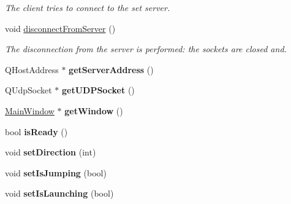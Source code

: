 \begin{DoxyCompactItemize}
\begin{DoxyCompactList}\small\item\em The client tries to connect to the set server. \item\end{DoxyCompactList}\item 
\hypertarget{classClient_a43ffca98bbbceba21e56b5af97586498}{
void \hyperlink{classClient_a43ffca98bbbceba21e56b5af97586498}{disconnectFromServer} ()}
\label{classClient_a43ffca98bbbceba21e56b5af97586498}

\begin{DoxyCompactList}\small\item\em The disconnection from the server is performed: the sockets are closed and. \item\end{DoxyCompactList}\item 
\hypertarget{classClient_a4023c23dd6185587fa9cf7ad76451b6c}{
QHostAddress $\ast$ {\bfseries getServerAddress} ()}
\label{classClient_a4023c23dd6185587fa9cf7ad76451b6c}

\item 
\hypertarget{classClient_a88e1c1bff6793865413947883c656dae}{
QUdpSocket $\ast$ {\bfseries getUDPSocket} ()}
\label{classClient_a88e1c1bff6793865413947883c656dae}

\item 
\hypertarget{classClient_a9f58df1f1b9eb062c94655d72cc6c5a3}{
\hyperlink{classMainWindow}{MainWindow} $\ast$ {\bfseries getWindow} ()}
\label{classClient_a9f58df1f1b9eb062c94655d72cc6c5a3}

\item 
\hypertarget{classClient_a6148446e0ee89272c5bb16f03f4e46fc}{
bool {\bfseries isReady} ()}
\label{classClient_a6148446e0ee89272c5bb16f03f4e46fc}

\item 
\hypertarget{classClient_afc4d01a2bd9d975f8b53c7026476a8a2}{
void {\bfseries setDirection} (int)}
\label{classClient_afc4d01a2bd9d975f8b53c7026476a8a2}

\item 
\hypertarget{classClient_a7021136179c923d02747085d88f2b22a}{
void {\bfseries setIsJumping} (bool)}
\label{classClient_a7021136179c923d02747085d88f2b22a}

\item 
\hypertarget{classClient_a9bd58148248ba8d1948cfaa24ab81bd9}{
void {\bfseries setIsLaunching} (bool)}
\label{classClient_a9bd58148248ba8d1948cfaa24ab81bd9}


\end{DoxyCompactItemize}
